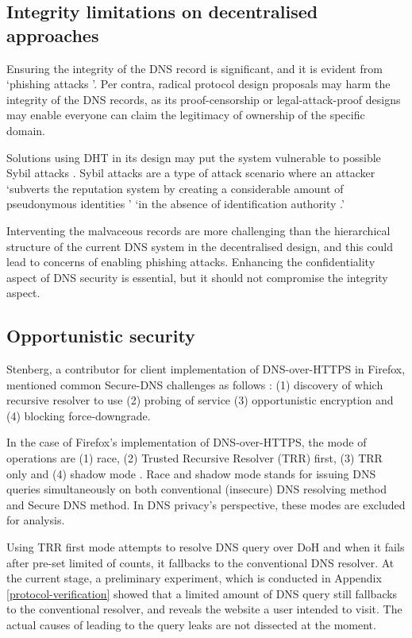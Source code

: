 \subsection{Integrity limitations on decentralised approaches}
Ensuring the integrity of the DNS record is significant, and it is evident from `phishing attacks \cite{ariyapperuma2007security, ollmann2004phishing}'.
Per contra, radical protocol design proposals may harm the integrity of the DNS records, as its proof-censorship or legal-attack-proof designs may enable everyone can claim the legitimacy of ownership of the specific domain.

Solutions using DHT in its design may put the system vulnerable to possible Sybil attacks \cite{6503215, SitE2002Scfp}.
Sybil attacks are a type of attack scenario where an attacker `subverts the reputation system by creating a considerable amount of pseudonymous identities \cite{TRIFA20141135}' `in the absence of identification authority \cite{douceur2002sybil}.'

Interventing the malvaceous records are more challenging than the hierarchical structure of the current DNS system in the decentralised design, and this could lead to concerns of enabling phishing attacks.
Enhancing the confidentiality aspect of DNS security is essential, but it should not compromise the integrity aspect.

\subsection{Opportunistic security}
Stenberg, a contributor for client implementation of DNS-over-HTTPS in Firefox, mentioned common Secure-DNS challenges as follows \cite{daniel-doh}: (1) discovery of which recursive resolver to use (2) probing of service (3) opportunistic encryption and (4) blocking force-downgrade.

In the case of Firefox's implementation of DNS-over-HTTPS, the mode of operations are (1) race, (2) Trusted Recursive Resolver (TRR) first, (3) TRR only and (4) shadow mode \cite{firefox-doh-engine}.
Race and shadow mode stands for issuing DNS queries simultaneously on both conventional (insecure) DNS resolving method and Secure DNS method.
In DNS privacy's perspective, these modes are excluded for analysis.

Using TRR first mode attempts to resolve DNS query over DoH and when it fails after pre-set limited of counts, it fallbacks to the conventional DNS resolver.
At the current stage, a preliminary experiment, which is conducted in Appendix \ref{protocol-verification} showed that a limited amount of DNS query still fallbacks to the conventional resolver, and reveals the website a user intended to visit.
The actual causes of leading to the query leaks are not dissected at the moment.